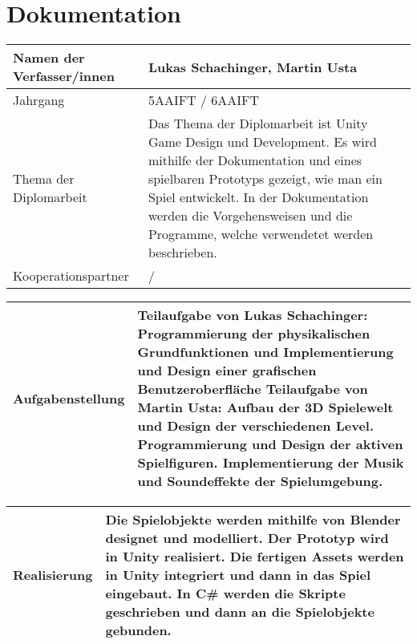 \chapter*{Dokumentation}

\renewcommand{\arraystretch}{2} %

\begin{tabular}{|m{}|m{}|}
\hline
Namen der Verfasser/innen & Lukas Schachinger, Martin Usta \\
\hline
Jahrgang & 5AAIFT / 6AAIFT \\
\hline
Thema der Diplomarbeit & Das Thema der Diplomarbeit ist Unity Game Design und Development. Es wird mithilfe der Dokumentation und eines spielbaren Prototyps gezeigt, wie man ein Spiel entwickelt. 
In der Dokumentation werden die Vorgehensweisen und die Programme, welche verwendetet werden beschrieben. \\
\hline
Kooperationspartner & / \\
\hline
\end{tabular}

\vspace{10pt}

\noindent
\begin{tabular}{|m{}|m{}|}
\hline
Aufgabenstellung & Teilaufgabe von Lukas Schachinger: \newline \newline Programmierung der physikalischen Grundfunktionen und Implementierung und Design einer grafischen Benutzeroberfläche \newline \newline Teilaufgabe von Martin Usta: \newline \newline Aufbau der 3D Spielewelt und Design der verschiedenen Level. Programmierung und Design der aktiven Spielfiguren. Implementierung der Musik und Soundeffekte der Spielumgebung.\\
\hline
\end{tabular}

\pagebreak

\noindent
\begin{tabular}{|m{}|m{}|}
\hline
Realisierung & Die Spielobjekte werden mithilfe von Blender designet und modelliert. \newline \newline Der Prototyp wird in Unity realisiert. Die fertigen Assets werden in Unity integriert und dann in das Spiel eingebaut. \newline \newline In C\# werden die Skripte geschrieben und dann an die Spielobjekte gebunden. \\
\hline
\end{tabular}

